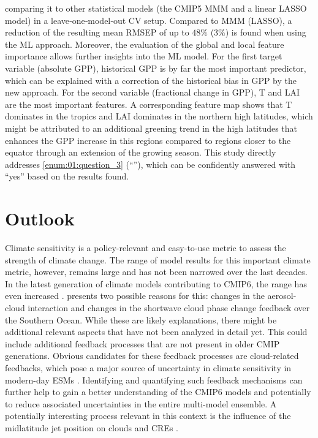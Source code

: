 comparing it to other statistical models (the \acs{CMIP}5 \ac{MMM} and a linear
\ac{LASSO} model) in a leave‐one‐model‐out \ac{CV} setup. Compared to \ac{MMM}
(\ac{LASSO}), a reduction of the resulting mean \ac{RMSEP} of up to $48
\unit{\%}$ ($3 \unit{\%}$) is found when using the \ac{ML} approach. Moreover,
the evaluation of the global and local feature importance allows further
insights into the \ac{ML} model. For the first target variable (absolute
\ac{GPP}), historical \ac{GPP} is by far the most important predictor, which
can be explained with a correction of the historical bias in \ac{GPP} by the
new approach. For the second variable (fractional change in \ac{GPP}), \ac{T}
and \ac{LAI} are the most important features. A corresponding feature map shows
that \ac{T} dominates in the tropics and \ac{LAI} dominates in the northern
high latitudes, which might be attributed to an additional greening trend in
the high latitudes that enhances the \ac{GPP} increase in this regions compared
to regions closer to the equator through an extension of the growing season.
This study directly addresses \cref{enum:01:question_3}
(\enquote{\emph{\KeyScienceQuestionThree{}}}), which can be confidently
answered with \enquote{yes} based on the results found.


\section{Outlook}
\label{sec:07:outlook}

Climate sensitivity is a policy-relevant and easy-to-use metric to assess the
strength of climate change. The range of model results for this important
climate metric, however, remains large and has not been narrowed over the last
decades. In the latest generation of climate models contributing to
\acs{CMIP}6, the range has even increased \autocite{Meehl2020}.
 presents two possible reasons for this:
changes in the aerosol-cloud interaction and changes in the shortwave cloud
phase change feedback over the Southern Ocean. While these are likely
explanations, there might be additional relevant aspects that have not been
analyzed in detail yet. This could include additional feedback processes that
are not present in older \ac{CMIP} generations. Obvious candidates for these
feedback processes are cloud-related feedbacks, which pose a major source of
uncertainty in climate sensitivity in modern-day \acp{ESM}
\autocite{Boucher2013}. Identifying and quantifying such feedback mechanisms
can further help to gain a better understanding of the \acs{CMIP}6 models and
potentially to reduce associated uncertainties in the entire multi-model
ensemble. A potentially interesting process relevant in this context is the
influence of the midlatitude jet position on clouds and \acp{CRE}
\autocite{Grise2016}.

